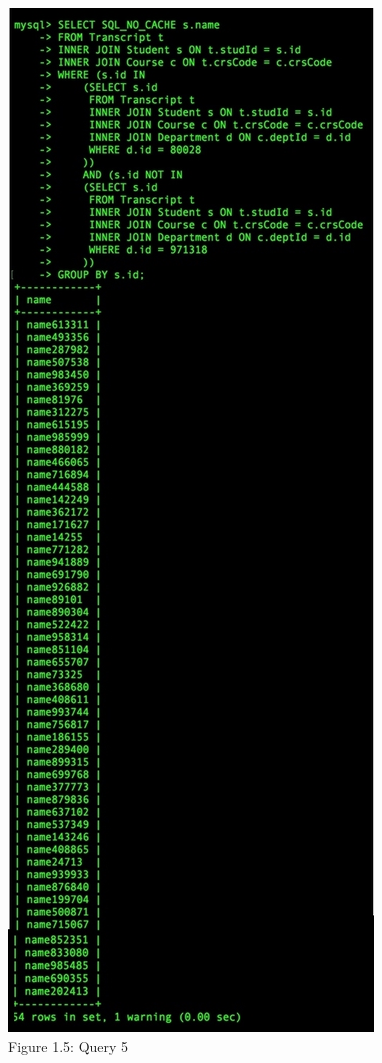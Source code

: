\documentclass[11pt]{report}
\begin{document}
\begin{center}
			\includegraphics[scale=0.5]{b5.PNG}\\
			Figure 1.5: Query 5\\

\end{center}
\end{document}
